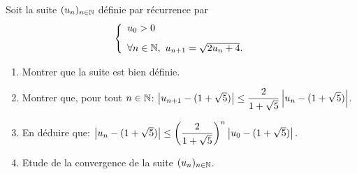 \documentclass[a4paper, 11pt,reqno]{article}
\begin{document}
\begin{exercice}
	Soit la suite $(u_n)_{n\in \mathbb{N}}$ d\'efinie par r\'ecurrence par
	$$\left\lbrace\begin{array}{l}
			u_0>0\vsec \\
			\forall n\in\N,\ u_{n+1}=\sqrt{2u_n+4}.
		\end{array}\right.$$
	\begin{enumerate}
		\item Montrer que la suite est bien d\'efinie.
		\item Montrer que, pour tout $n\in\mathbb{N}$: $\left| u_{n+1}-(1+\sqrt{5}) \right|\leq \displaystyle\frac{2}{1+\sqrt{5}} \left| u_n-(1+\sqrt{5}) \right|$.
		\item En d\'eduire que: $\left| u_n-(1+\sqrt{5}) \right|\leq \left( \displaystyle\frac{2}{1+\sqrt{5}} \right)^n\left| u_0-(1+\sqrt{5}) \right|.$
		\item Etude de la convergence de la suite $(u_n)_{n\in \mathbb{N}}$.
	\end{enumerate}
\end{exercice}
\end{document}
